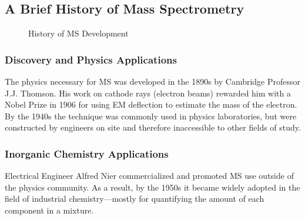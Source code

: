 \documentclass[letterpaper, 10 pt, conference]{ieeeconf}  %
\begin{document}
            \FloatBarrier
    \subsection{\textbf{A Brief History of Mass Spectrometry}}
        \begin{figure}[h]
            \centering
        
            \caption{History of MS Development}
        \end{figure}

        \subsubsection[\textbf{Discovery and Physics Applications}]{\textbf{Discovery and Physics Applications}\autocite{R8}}\hfill \hfill

        The physics necessary for MS was developed in the 1890s by Cambridge Professor J.J. Thomson. His work on cathode rays (electron beams) rewarded him with a Nobel Prize in 1906 for using EM deflection to estimate the mass of the electron. By the 1940s the technique was commonly used in physics laboratories, but were constructed by engineers on site and therefore inaccessible to other fields of study.

        \vspace{5 pt}

        \subsubsection[\textbf{Inorganic Chemistry Applications}]{\textbf{Inorganic Chemistry Applications}\autocite{R8}}\hfill \hfill

        Electrical Engineer Alfred Nier commercialized and promoted MS use outside of the physics community. As a result, by the 1950s it became widely adopted in the field of industrial chemistry---mostly for quantifying the amount of each component in a mixture.
\end{document}
